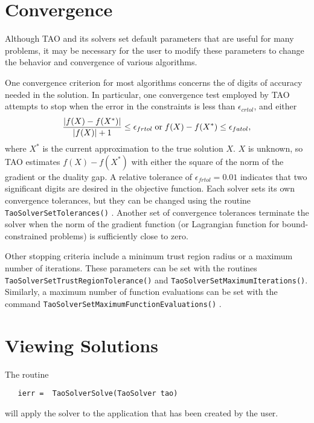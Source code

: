 \section{Convergence}\label{sec:customize}

Although TAO and its solvers set default parameters 
that are useful
for many problems, it may be necessary for the user to modify these
parameters to change the behavior and convergence of various algorithms.

One convergence criterion for most algorithms concerns the
of digits of accuracy needed in the solution.  In particular,
one convergence test employed by TAO attempts to stop when
the error in the constraints is less than $\epsilon_{crtol}$,
 and either
\[\frac{ |f(X) - f(X^*)|}{ |f(X)| + 1} \leq \epsilon_{frtol}
\;\textnormal{or}\;
f(X) - f(X^*)  \leq \epsilon_{fatol}, \]
where $X^*$ is the current approximation to the true solution $X$.
$X$ is unknown, so TAO estimates $f(X) - f(X^*)$ with either 
the square of the norm of the gradient or the duality gap.
A relative tolerance of $\epsilon_{frtol}=0.01$ indicates that two
significant digits are desired in the objective function.
Each solver sets its own  convergence tolerances, but they can
be changed using the routine
{\tt TaoSolverSetTolerances()} 
. 
Another set of convergence tolerances 
terminate the solver when the norm of the gradient function
(or Lagrangian function for bound-constrained problems)
is sufficiently close to zero.

Other stopping criteria include a minimum trust region radius or 
a maximum number of iterations.  These parameters can be set with
the routines {\tt TaoSolverSetTrustRegionTolerance()}
and {\tt TaoSolverSetMaximumIterations()}.
Similarly, a maximum number of function evaluations can be set 
with the command 
{\tt TaoSolverSetMaximumFunctionEvaluations()}
.

\section{Viewing Solutions}

The routine
\begin{verbatim}
   ierr =  TaoSolverSolve(TaoSolver tao)
\end{verbatim}
\noindent
will apply the solver to the application that has been created by the user.

